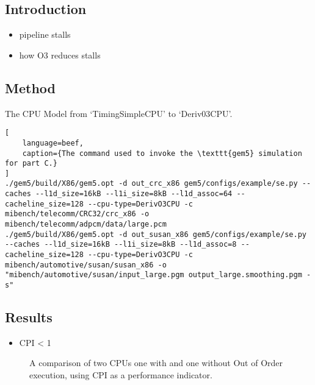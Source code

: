 %
%



\subsection{Introduction}

\begin{itemize}
\item pipeline stalls
\item how O3 reduces stalls
\end{itemize}


\subsection{Method}

The CPU Model from `TimingSimpleCPU' to `Deriv03CPU'.

\begin{lstlisting}[
    language=beef,
    caption={The command used to invoke the \texttt{gem5} simulation for part C.}
]
./gem5/build/X86/gem5.opt -d out_crc_x86 gem5/configs/example/se.py --caches --l1d_size=16kB --l1i_size=8kB --l1d_assoc=64 --cacheline_size=128 --cpu-type=DerivO3CPU -c mibench/telecomm/CRC32/crc_x86 -o mibench/telecomm/adpcm/data/large.pcm
./gem5/build/X86/gem5.opt -d out_susan_x86 gem5/configs/example/se.py --caches --l1d_size=16kB --l1i_size=8kB --l1d_assoc=8 --cacheline_size=128 --cpu-type=DerivO3CPU -c mibench/automotive/susan/susan_x86 -o "mibench/automotive/susan/input_large.pgm output_large.smoothing.pgm -s"
\end{lstlisting}


\subsection{Results}

\begin{itemize}
\item CPI < 1
\end{itemize}


\begin{figure}[H]
    \centering
    
    \caption{
        A comparison of two CPUs one with and one without Out of Order
    execution, using CPI as a performance indicator.
    }
    \label{fig:partc-cpi}
\end{figure}
